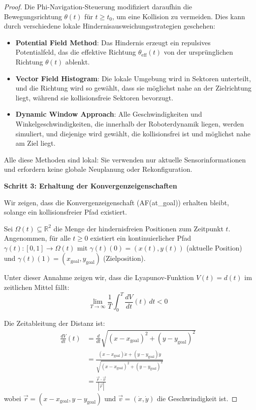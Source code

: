 ﻿\documentclass[a4paper,12pt]{article}
\theoremstyle{definition}
\begin{document}
\begin{proof}
Die Phi-Navigation-Steuerung modifiziert daraufhin die Bewegungsrichtung $\theta(t)$ für $t \geq t_0$, um eine Kollision zu vermeiden. Dies kann durch verschiedene lokale Hindernisausweichungsstrategien geschehen:
\begin{itemize}
\item \textbf{Potential Field Method}: Das Hindernis erzeugt ein repulsives Potentialfeld, das die effektive Richtung $\theta_{\text{eff}}(t)$ von der ursprünglichen Richtung $\theta(t)$ ablenkt.
\item \textbf{Vector Field Histogram}: Die lokale Umgebung wird in Sektoren unterteilt, und die Richtung wird so gewählt, dass sie möglichst nahe an der Zielrichtung liegt, während sie kollisionsfreie Sektoren bevorzugt.
\item \textbf{Dynamic Window Approach}: Alle Geschwindigkeiten und Winkelgeschwindigkeiten, die innerhalb der Roboterdynamik liegen, werden simuliert, und diejenige wird gewählt, die kollisionsfrei ist und möglichst nahe am Ziel liegt.
\end{itemize}

Alle diese Methoden sind lokal: Sie verwenden nur aktuelle Sensorinformationen und erfordern keine globale Neuplanung oder Rekonfiguration.

\textbf{Schritt 3: Erhaltung der Konvergenzeigenschaften}

Wir zeigen, dass die Konvergenzeigenschaft (AF(at\_goal)) erhalten bleibt, solange ein kollisionsfreier Pfad existiert.

Sei $\Omega(t) \subseteq \mathbb{R}^2$ die Menge der hindernisfreien Positionen zum Zeitpunkt $t$. Angenommen, für alle $t \geq 0$ existiert ein kontinuierlicher Pfad $\gamma(t): [0,1] \to \Omega(t)$ mit $\gamma(t)(0) = (x(t), y(t))$ (aktuelle Position) und $\gamma(t)(1) = (x_{\text{goal}}, y_{\text{goal}})$ (Zielposition).

Unter dieser Annahme zeigen wir, dass die Lyapunov-Funktion $V(t) = d(t)$ im zeitlichen Mittel fällt:
\begin{equation}
\lim_{T \to \infty} \frac{1}{T} \int_0^T \frac{dV}{dt}(t) \, dt < 0
\end{equation}

Die Zeitableitung der Distanz ist:
\begin{align}
\frac{dV}{dt}(t) &= \frac{d}{dt} \sqrt{(x-x_{\text{goal}})^2 + (y-y_{\text{goal}})^2} \\
&= \frac{(x-x_{\text{goal}})\dot{x} + (y-y_{\text{goal}})\dot{y}}{\sqrt{(x-x_{\text{goal}})^2 + (y-y_{\text{goal}})^2}} \\
&= \frac{\vec{r} \cdot \vec{v}}{|\vec{r}|}
\end{align}
wobei $\vec{r} = (x-x_{\text{goal}}, y-y_{\text{goal}})$ und $\vec{v} = (\dot{x}, \dot{y})$ die Geschwindigkeit ist.


\end{proof}
\end{document}
